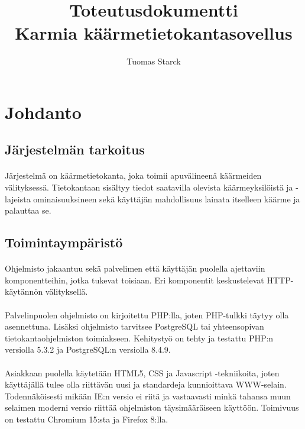 \documentclass[11pt]{article}
\begin{document}
\title{\Huge{\bf Toteutusdokumentti} \\ \Large{Karmia käärmetietokantasovellus}}
\author{Tuomas Starck}
\maketitle

\vspace{4em}

\section{Johdanto}

\subsection{Järjestelmän tarkoitus}

\paragraph{} Järjestelmä on käärmetietokanta, joka toimii apuvälineenä käärmeiden välityksessä. Tietokantaan sisältyy tiedot saatavilla olevista käärmeyksilöistä ja -lajeista ominaisuuksineen sekä käyttäjän mahdollisuus lainata itselleen käärme ja palauttaa se.

\subsection{Toimintaympäristö}

\paragraph{} Ohjelmisto jakaantuu sekä palvelimen että käyttäjän puolella ajettaviin komponentteihin, jotka tukevat toisiaan. Eri komponentit keskustelevat HTTP-käytännön välityksellä.

\paragraph{} Palvelinpuolen ohjelmisto on kirjoitettu PHP:lla, joten PHP-tulkki täytyy olla asennettuna. Lisäksi ohjelmisto tarvitsee PostgreSQL tai yhteensopivan tietokantaohjelmiston toimiakseen. Kehitystyö on tehty ja testattu PHP:n versiolla 5.3.2 ja PostgreSQL:n versiolla 8.4.9.

\paragraph{} Asiakkaan puolella käytetään HTML5, CSS ja Javascript -tekniikoita, joten käyttäjällä tulee olla riittävän uusi ja standardeja kunnioittava WWW-selain. Todennäköisesti mikään IE:n versio ei riitä ja vastaavasti minkä tahansa muun selaimen moderni versio riittää ohjelmiston täysimääräiseen käyttöön. Toimivuus on testattu Chromium 15:sta ja Firefox 8:lla.
\end{document}
